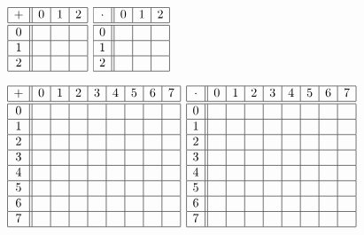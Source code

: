 \documentclass[letterpaper,12pt,fleqn]{article}
\begin{document}
\begin{enumerate}[left=0in,itemsep=0.5in]
  \bigskip

  \(\begin{array}{|c||c|c|c|}
  \hline
  + & 0 & 1 & 2 \\
  \hline
  \hline
  0 & & & \\
  \hline
  1 & & & \\
  \hline
  2 & & & \\
  \hline
  \end{array}\)
  \qquad
  \(\begin{array}{|c||c|c|c|}
  \hline
  \cdot & 0 & 1 & 2 \\
  \hline
  \hline
  0 & & & \\
  \hline
  1 & & & \\
  \hline
  2 & & & \\
  \hline
  \end{array}\)

  \bigskip

  \(\begin{array}{|c||c|c|c|c|c|c|c|c|}
  \hline
  + & 0 & 1 & 2 & 3 & 4 & 5 & 6 & 7 \\
  \hline
  \hline
  0 & & & & & & & & \\
  \hline
  1 & & & & & & & & \\
  \hline
  2 & & & & & & & & \\
  \hline
  3 & & & & & & & & \\
  \hline
  4 & & & & & & & & \\
  \hline
  5 & & & & & & & & \\
  \hline
  6 & & & & & & & & \\
  \hline
  7 & & & & & & & & \\
  \hline
  \end{array}\)
  \qquad
  \(\begin{array}{|c||c|c|c|c|c|c|c|c|}
  \hline
  \cdot & 0 & 1 & 2 & 3 & 4 & 5 & 6 & 7 \\
  \hline
  \hline
  0 & & & & & & & & \\
  \hline
  1 & & & & & & & & \\
  \hline
  2 & & & & & & & & \\
  \hline
  3 & & & & & & & & \\
  \hline
  4 & & & & & & & & \\
  \hline
  5 & & & & & & & & \\
  \hline
  6 & & & & & & & & \\
  \hline
  7 & & & & & & & & \\
  \hline
  \end{array}\)


\end{enumerate}
\end{document}
